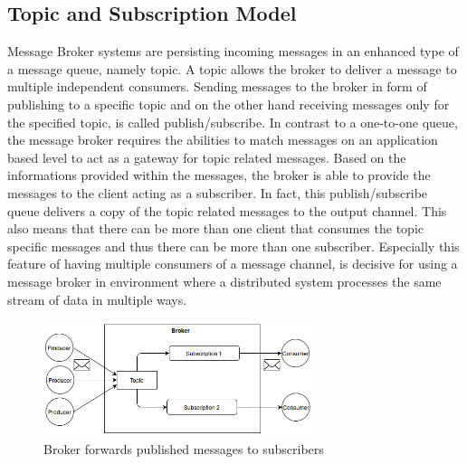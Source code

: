 

\subsection{Topic and Subscription Model}
\label{intro-messaging-publishsubscribe}
Message Broker systems are persisting incoming messages in an enhanced type of a
message queue, namely topic. A topic allows the broker to deliver a message to
multiple independent consumers. Sending messages to the broker in form of
publishing to a specific topic and on the other hand receiving messages only for
the specified topic, is called publish/subscribe. In contrast to a one-to-one
queue, the message broker requires the abilities to match messages on an
application based level to act as a gateway for topic related messages. Based on
the informations provided within the messages, the broker is able to
provide the messages to the client acting as a subscriber. In fact,
this publish/subscribe queue delivers a copy of the topic related messages to
the output channel. This also means that there can be more than one client that
consumes the topic specific
messages and thus there can be more than one subscriber. Especially this feature
of having multiple consumers of a message channel, is decisive for using a
message broker in environment where a distributed system processes the same stream of
data in multiple ways. 
\cite{EIP03} \cite{TAN06}

\begin{figure}[H]
    \centering
    \includegraphics[width=0.7\textwidth]{images/topic-subscription.png}
    \caption{Broker forwards published messages to subscribers}
    \label{fig:topic-subscription}
\end{figure}

